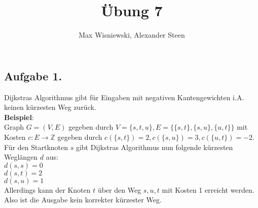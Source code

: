 \documentclass[11pt,a4paper,ngerman]{article}
\date{}
\title{Übung 7}
\author{Max Wisniewski, Alexander Steen}
\begin{document}

\renewcommand{\figurename}{Figure}

\maketitle
\thispagestyle{fancy}

\subsection*{Aufgabe 1.}
Dijkstras Algorithmus gibt für Eingaben mit negativen Kantengewichten i.A. keinen kürzesten Weg zurück. \\

\textbf{Beispiel}: \\
Graph $G = (V,E)$ gegeben durch $V = \{s,t,u \}, E = \{\{s,t\},\{s,u\},\{u,t\} \}$ mit Kosten $c: E \to \mathbb{Z}$ gegeben durch $c(\{s,t\}) = 2, c(\{s,u\}) = 3, c(\{u,t\}) = -2$.
Für den Startknoten $s$ gibt Dijkstras Algorithmus nun folgende kürzesten Weglängen $d$ aus: \\
$d(s,s) = 0$ \\
$d(s,t) = 2$ \\
$d(s,u) = 1$ \\

Allerdings kann der Knoten $t$ über den Weg $s,u,t$ mit Kosten 1 erreicht werden. Also ist die Ausgabe kein korrekter kürzester Weg.

%
%
%

\end{document}
